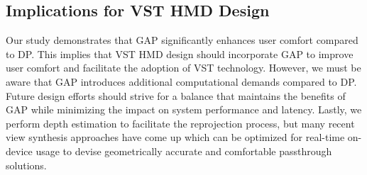 \subsection{Implications for VST HMD Design}
Our study demonstrates that GAP significantly enhances user comfort compared to DP. This implies that VST HMD design should incorporate GAP to improve user comfort and facilitate the adoption of VST technology. However, we must be aware that GAP introduces additional computational demands compared to DP. Future design efforts should strive for a balance that maintains the benefits of GAP while minimizing the impact on system performance and latency. 
Lastly, we perform depth estimation to facilitate the reprojection process, but many recent view synthesis approaches \cite{kerbl3Dgaussians, mildenhall2020nerf, li2023dynibar} have come up which can be optimized for real-time on-device usage to devise geometrically accurate and comfortable passthrough solutions.
